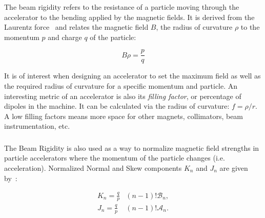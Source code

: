 \subsubsection{}

The beam rigidity refers to the resistance of a particle moving through the accelerator to the
bending applied by the magnetic fields. It is derived from the Laurentz force~\cite{dilly_corrections_2022}
and relates the magnetic field $B$, the radius of curvature $\rho$ to the momentum $p$ and charge $q$
of the particle:

\begin{equation}
    B \rho = \frac{p}{q}
    \label{eq:magnetic_fields_beam_rigidity}
\end{equation}

It is of interest when designing an accelerator to set the maximum field as well as the required
radius of curvature for a specific momentum and particle.
An interesting metric of an accelerator is also its \textit{filling factor}, or percentage of
dipoles in the machine. It can be calculated via the radius of curvature: $f = \rho / r$. A low 
filling factors means more space for other magnets, collimators, beam instrumentation, etc.

\subsubsection{}

The Beam Rigidity is also used as a way to normalize magnetic field strengths in particle
accelerators where the momentum of the particle changes (i.e. acceleration).
Normalized Normal and Skew components $K_n$ and $J_n$ are given by~\cite{wolf_engineering_2001}:

\begin{equation}
    \begin{aligned}
        K_n =  \frac{q}{p} &(n-1)! \mathcal{B}_n, \\ 
        J_n =  \frac{q}{p} &(n-1)! \mathcal{A}_n.
    \end{aligned}
    \label{eq:magnetic_fields_normalized}
\end{equation}



\subsection{}

